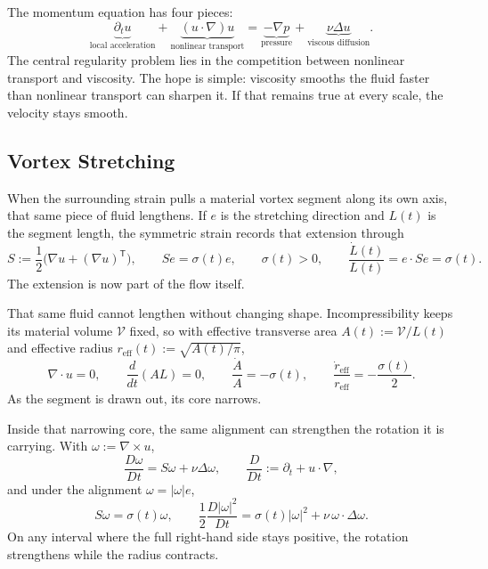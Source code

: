 
The momentum equation has four pieces:
\[
  \underbrace{\partial_t u}_{\text{local acceleration}}
  +
  \underbrace{(u\cdot\nabla)u}_{\text{nonlinear transport}}
  =
  \underbrace{-\nabla p}_{\text{pressure}}
  +
  \underbrace{\nu\Delta u}_{\text{viscous diffusion}}.
\]
The central regularity problem lies in the competition between nonlinear transport and viscosity.
The hope is simple: viscosity smooths the fluid faster than nonlinear transport can sharpen it.
If that remains true at every scale, the velocity stays smooth.

\subsection{Vortex Stretching}\label{sub:ThePerfectlyStretchingVortex}

When the surrounding strain pulls a material vortex segment along its own axis, that same piece of fluid lengthens. If \(e\) is the stretching direction and \(L(t)\) is the segment length, the symmetric strain records that extension through
\[
  S:=\frac12\bigl(\nabla u+(\nabla u)^{\mathsf T}\bigr),
  \qquad
  Se=\sigma(t)e,
  \qquad
  \sigma(t)>0,
  \qquad
  \frac{\dot L(t)}{L(t)}
  =
  e\cdot Se
  =
  \sigma(t).
\]
The extension is now part of the flow itself.

That same fluid cannot lengthen without changing shape. Incompressibility keeps its material volume \(\mathcal V\) fixed, so with effective transverse area \(A(t):=\mathcal V/L(t)\) and effective radius \(r_{\mathrm{eff}}(t):=\sqrt{A(t)/\pi}\),
\[
  \nabla\cdot u=0,
  \qquad
  \frac{d}{dt}(A L)=0,
  \qquad
  \frac{\dot A}{A}=-\sigma(t),
  \qquad
  \frac{\dot r_{\mathrm{eff}}}{r_{\mathrm{eff}}}
  =
  -\frac{\sigma(t)}{2}.
\]
As the segment is drawn out, its core narrows.

Inside that narrowing core, the same alignment can strengthen the rotation it is carrying. With \(\omega:=\nabla\times u\),
\[
  \frac{D\omega}{Dt}
  =
  S\omega+\nu\Delta\omega,
  \qquad
  \frac{D}{Dt}
  :=
  \partial_t+u\cdot\nabla,
\]
and under the alignment \(\omega=|\omega|e\),
\[
  S\omega
  =
  \sigma(t)\omega,
  \qquad
  \frac12\frac{D|\omega|^2}{Dt}
  =
  \sigma(t)|\omega|^2
  +
  \nu\,\omega\cdot\Delta\omega.
\]
On any interval where the full right-hand side stays positive, the rotation strengthens while the radius contracts.

